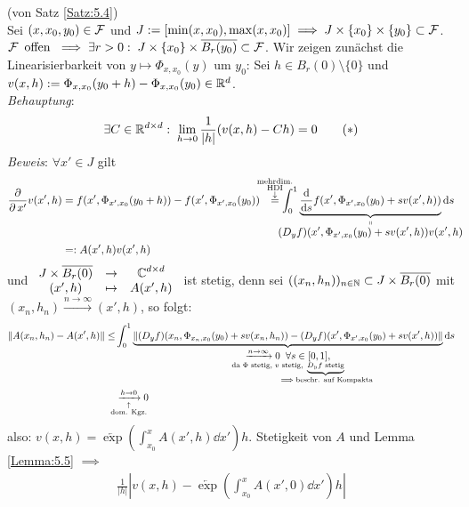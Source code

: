 \documentclass[a4paper]{article}
\begin{document}
\begin{Beweis}
(von Satz \ref{Satz:5.4})\\
Sei $(x,x_0,y_0)\in\operatorname{\mathcal{F}}$ und $J:=[\min(x,x_0),\max(x,x_0)]\implies J\times \{x_0\}\times\{y_0\}\subset \operatorname{\mathcal{F}}$. $\operatorname{\mathcal{F}}\text{ offen }\implies \exists r>0:\;J\times\{x_0\}\times\overline{B_r(y_0)}\subset\operatorname{\mathcal{F}}$. Wir zeigen zunächst die Linearisierbarkeit von $y\mapsto \Phi_{x,x_0}(y)$ um $y_0$: Sei $h\in B_r(0)\setminus\{0\}$ und $v(x,h):=\Phi_{x,x_0}(y_0+h)-\Phi_{x,x_0}(y_0)\in\mathbb R^d$.\\
\textit{Behauptung}: 
\[\exists C\in \mathbb R^{d\times d}:\;\lim_{h\to0}\frac{1}{|h|}(v(x,h)-Ch)=0\tag{$*$}\label{s1}\]
\textit{Beweis}: $\forall x'\in J$ gilt
\begin{align*}
\frac{\pp}{\pp x'}v(x',h)&=f(x',\Phi_{x',x_0}(y_0+h))-f(x',\Phi_{x',x_0}(y_0))
&\overset{\mathclap{\substack{\text{mehrdim.}\\\text{HDI}\\\downarrow}}}{=}\int_0^1\underbrace{\frac{\dd }{\dd s}f(x',\Phi_{x',x_0}(y_0)+sv(x',h))
}_{\mathclap{\substack{\shortparallel\\ \displaystyle(D_yf)(x',\Phi_{x',x_0}(y_0)+sv(x',h))v(x',h)}}}\dd s\\
&=:A(x',h)v(x',h)
\end{align*}
und $\begin{array}{clc}
J\times \overline{B_r(0)}&\to&\operatorname{\mathbb C}^{d\times d}\\
(x',h)&\mapsto&A(x',h)
\end{array}$ ist
stetig, denn sei $((x_n,h_n))_{n\in\operatorname{\mathbb N}}\subset J\times\overline{B_r(0)}$ mit $(x_n,h_n)\xrightarrow{n\to\infty}(x',h)$, so folgt:
\begin{align*}
\|A(x_n,h_n)-A(x',h)\|
\le&\int_0^1\underbrace{\|(D_yf)(x_n,\Phi_{x_n,x_0}(y_0)+sv(x_n,h_n))
-(D_yf)(x',\Phi_{x',x_0}(y_0)+sv(x',h))\|}_{\substack{\displaystyle\xrightarrow{n\to\infty}0\;\;\forall s\in [0,1],\\\text{da $\Phi$ stetig, $v$ stetig, } \underbrace{\scriptstyle\text{$D_yf$ stetig}}_{\scriptstyle\mathclap{\implies\text{beschr. auf Kompakta}}}}}\dd s\\
&\xrightarrow[\mathclap{\substack{\uparrow\\\text{dom. Kgz.}}}]{h\to0}0
\end{align*}
also: $v(x,h)=\overleftarrow{\exp}\left(\int_{x_0}^xA(x',h)\dd x'\right)h$. Stetigkeit von $A$ und Lemma \ref{Lemma:5.5} $\implies$
\begin{align*}
\frac{1}{|h|}\left|v(x,h)-\overleftarrow{\exp}\left(\int_{x_0}^xA(x',0)\dd x'\right)h\right|

\end{align*}
\end{Beweis}
\end{document}
